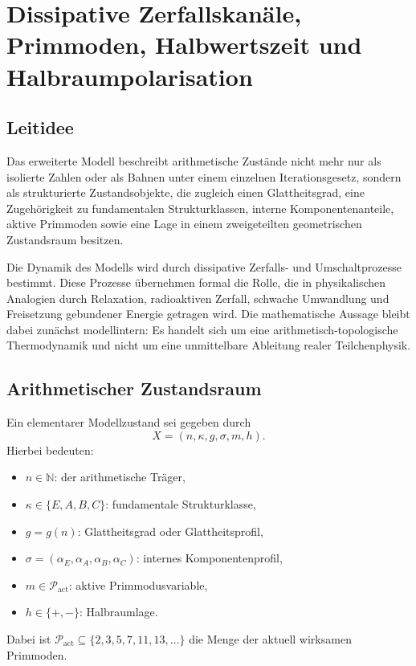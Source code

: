 \documentclass[11pt,a4paper]{article}
\theoremstyle{definition}
\begin{document}
\section{Dissipative Zerfallskanäle, Primmoden, Halbwertszeit und Halbraumpolarisation}

\subsection{Leitidee}

Das erweiterte Modell beschreibt arithmetische Zustände nicht mehr nur als isolierte Zahlen oder als Bahnen unter einem einzelnen Iterationsgesetz, sondern als strukturierte Zustandsobjekte, die zugleich einen Glattheitsgrad, eine Zugehörigkeit zu fundamentalen Strukturklassen, interne Komponentenanteile, aktive Primmoden sowie eine Lage in einem zweigeteilten geometrischen Zustandsraum besitzen.

Die Dynamik des Modells wird durch dissipative Zerfalls- und Umschaltprozesse bestimmt. Diese Prozesse übernehmen formal die Rolle, die in physikalischen Analogien durch Relaxation, radioaktiven Zerfall, schwache Umwandlung und Freisetzung gebundener Energie getragen wird. Die mathematische Aussage bleibt dabei zunächst modellintern: Es handelt sich um eine arithmetisch-topologische Thermodynamik und nicht um eine unmittelbare Ableitung realer Teilchenphysik.

\subsection{Arithmetischer Zustandsraum}

Ein elementarer Modellzustand sei gegeben durch
\[
X=(n,\kappa,g,\sigma,m,h).
\]
Hierbei bedeuten:
\begin{itemize}
	\item $n\in\mathbb{N}$: der arithmetische Träger,
	\item $\kappa\in\{E,A,B,C\}$: fundamentale Strukturklasse,
	\item $g=g(n)$: Glattheitsgrad oder Glattheitsprofil,
	\item $\sigma=(\alpha_E,\alpha_A,\alpha_B,\alpha_C)$: internes Komponentenprofil,
	\item $m\in\mathcal{P}_{\mathrm{act}}$: aktive Primmodusvariable,
	\item $h\in\{+,-\}$: Halbraumlage.
\end{itemize}

Dabei ist $\mathcal{P}_{\mathrm{act}}\subseteq\{2,3,5,7,11,13,\dots\}$ die Menge der aktuell wirksamen Primmoden.
\end{document}
